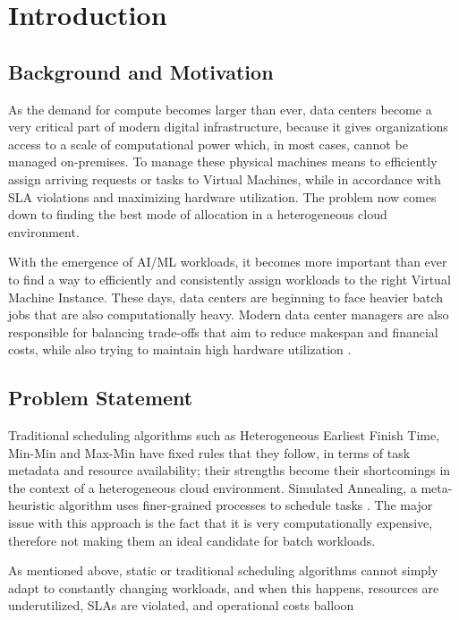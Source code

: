 
\section{Introduction}
\label{sec:Introduction}
\subsection{Background and Motivation}
As the demand for compute becomes larger than ever, data centers become a very critical part of modern digital infrastructure, because it gives organizations access to a scale of computational power which, in most cases, cannot be managed on-premises. To manage these physical machines means to efficiently assign arriving requests or tasks to Virtual Machines, while in accordance with SLA violations and maximizing hardware utilization. The problem now comes down to finding the best mode of allocation in a heterogeneous cloud environment.

With the emergence of AI/ML workloads, it becomes more important than ever to find a way to efficiently and consistently assign workloads to the right Virtual Machine Instance. These days, data centers are beginning to face heavier batch jobs that are also computationally heavy. Modern data center managers are also responsible for balancing trade-offs that aim to reduce makespan and financial costs, while also trying to maintain high hardware utilization \cite{Jeba2019Green}.

\subsection{Problem Statement}
Traditional scheduling algorithms such as Heterogeneous Earliest Finish Time, Min-Min and Max-Min have fixed rules that they follow, in terms of task metadata and resource availability; their strengths become their shortcomings in the context of a heterogeneous cloud environment. Simulated Annealing, a meta-heuristic algorithm uses finer-grained processes to schedule tasks \cite{KUMAR20191}. The major issue with this approach is the fact that it is very computationally expensive, therefore not making them an ideal candidate for batch workloads.

As mentioned above, static or traditional scheduling algorithms cannot simply adapt to constantly changing workloads, and when this happens, resources are underutilized, SLAs are violated,  and operational costs balloon

